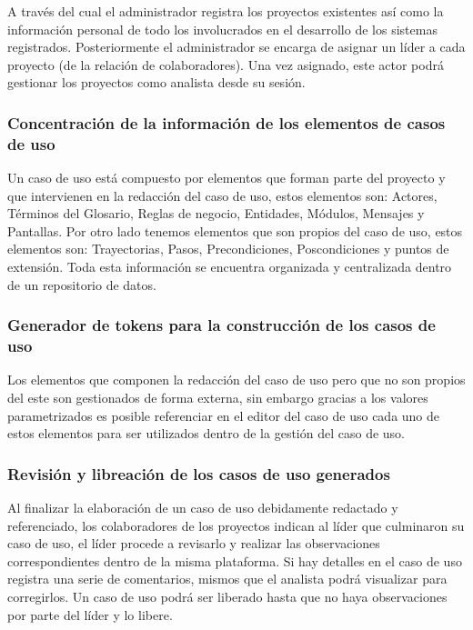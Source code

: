 \documentclass{article}
\begin{document}
\begin{multicols}{2}
	A través del cual el administrador registra los proyectos existentes así como la información personal de todo los involucrados en el desarrollo de los sistemas registrados. Posteriormente el administrador se encarga de asignar un líder a cada proyecto (de la relación de colaboradores). Una vez asignado, este actor podrá gestionar los proyectos como analista desde su sesión.
	
	\subsubsection{Concentración de la información de los elementos de casos de uso}
	
	Un caso de uso está compuesto por elementos que forman parte del proyecto y que intervienen en la redacción del caso de uso, estos elementos son: Actores, Términos del Glosario, Reglas de negocio, Entidades, Módulos, Mensajes y Pantallas. Por otro lado tenemos elementos que son propios del caso de uso, estos elementos son: Trayectorias, Pasos, Precondiciones, Poscondiciones y puntos de extensión.
	Toda esta información se encuentra organizada y centralizada dentro de un repositorio de datos.
	
	\subsubsection{Generador de tokens para la construcción de los casos de uso}
	
	Los elementos que componen la redacción del caso de uso pero que no son propios del este son gestionados de forma externa, sin embargo gracias a los valores parametrizados es posible referenciar en el editor del caso de uso cada uno de estos elementos para ser utilizados dentro de la gestión del caso de uso.
	
	\subsubsection{Revisión y libreación de los casos de uso generados}
	
	Al finalizar la elaboración de un caso de uso debidamente redactado y referenciado, los colaboradores de los proyectos indican al líder que culminaron su caso de uso, el líder procede a revisarlo y realizar las observaciones correspondientes dentro de la misma plataforma. Si hay detalles en el caso de uso registra una serie de comentarios, mismos que el analista podrá visualizar para corregirlos. Un caso de uso podrá ser liberado hasta que no haya observaciones por parte del líder y lo libere.
	

\end{multicols}
\end{document}
